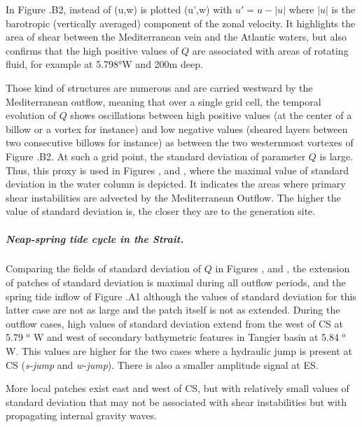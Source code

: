 In Figure .B2, instead of (u,w) is plotted (u',w) with $u'=u-|u|$ where $|u|$ is the \color{red}barotropic (vertically averaged)\color{black} component of the zonal velocity. It highlights the area of shear between the Mediterranean vein and the Atlantic waters, but also confirms that the high positive values of $Q$ are associated with areas of rotating fluid, for example at 5.798°W and 200m deep. 

Those kind of structures are numerous and are carried westward by the Mediterranean outflow, meaning that over a single grid cell, the temporal evolution of $Q$ shows oscillations between high positive values (at the center of a billow or a vortex for instance) and low negative values (sheared layers between two consecutive billows for instance) as between the two westernmost vortexes of Figure .B2. At such a grid point, the standard deviation of parameter $Q$ is large. Thus, this proxy is used in Figures ,  and , where the maximal value of standard deviation in the water column is depicted. It indicates the areas where primary shear instabilities are advected by the Mediterranean Outflow. The higher the value of standard deviation is, the closer they are to the generation site.

\subparagraph{Neap-spring tide cycle in the Strait.}
Comparing the fields of standard deviation of $Q$ in Figures ,  and , the extension of patches of standard deviation is maximal during all outflow periods, and the spring tide inflow of Figure .A1 although the values of standard deviation for this latter case are not as large and the patch itself is not as extended. During the outflow cases, high values of standard deviation extend from the west of CS at 5.79 $^\text{o}$ W and west of secondary bathymetric features in Tangier basin at 5.84 $^\text{o}$ W. This values are higher for the two cases where a hydraulic jump is present at CS (\textit{s-jump} and \textit{w-jump}). There is also a smaller amplitude signal at ES.

More local patches exist east and west of CS, but with relatively small values of standard deviation that may not be associated with shear instabilities but with propagating internal gravity waves.

